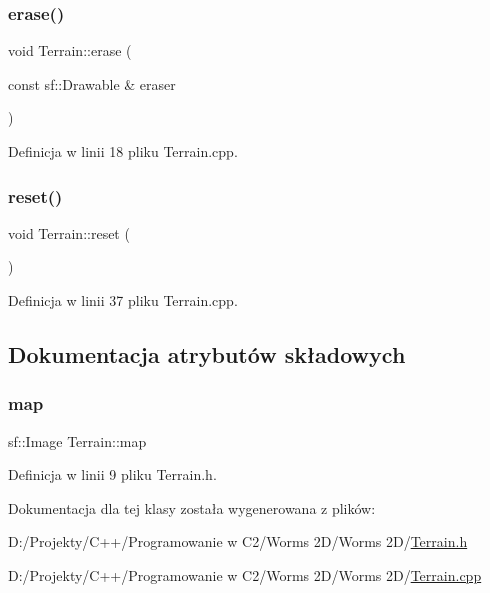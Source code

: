 \mbox{\label{class_terrain_a552c55d3ce93ae1c8988432acdf7aea1}} 
\subsubsection{\texorpdfstring{erase()}{erase()}}
{\footnotesize\ttfamily void Terrain\+::erase (\begin{DoxyParamCaption}\item[{const sf\+::\+Drawable \&}]{eraser }\end{DoxyParamCaption})}



Definicja w linii 18 pliku Terrain.\+cpp.

\mbox{\label{class_terrain_a009d97df85f0704ad9ea3c61fcd11080}} 
\subsubsection{\texorpdfstring{reset()}{reset()}}
{\footnotesize\ttfamily void Terrain\+::reset (\begin{DoxyParamCaption}{ }\end{DoxyParamCaption})}



Definicja w linii 37 pliku Terrain.\+cpp.



\subsection{Dokumentacja atrybutów składowych}
\mbox{\label{class_terrain_afda7533fb267038f082301a417691483}} 
\subsubsection{\texorpdfstring{map}{map}}
{\footnotesize\ttfamily sf\+::\+Image Terrain\+::map}



Definicja w linii 9 pliku Terrain.\+h.



Dokumentacja dla tej klasy została wygenerowana z plików\+:\begin{DoxyCompactItemize}
\item 
D\+:/\+Projekty/\+C++/\+Programowanie w C2/\+Worms 2\+D/\+Worms 2\+D/\mbox{\hyperlink{_terrain_8h}{Terrain.\+h}}\item 
D\+:/\+Projekty/\+C++/\+Programowanie w C2/\+Worms 2\+D/\+Worms 2\+D/\mbox{\hyperlink{_terrain_8cpp}{Terrain.\+cpp}}\end{DoxyCompactItemize}

